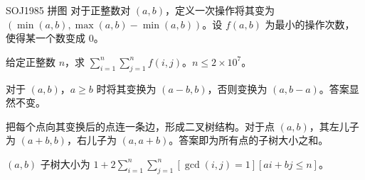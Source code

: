 \documentclass[../main.tex]{subfiles}
\begin{document}
\subsubsection{}

\begin{frame}{SOJ1985 拼图}
对于正整数对 $(a,b)$，定义一次操作将其变为 $(\min(a,b),\max(a,b)-\min(a,b))$。设 $f(a,b)$ 为最小的操作次数，使得某一个数变成 $0$。

给定正整数 $n$，求 $\sum\limits_{i=1}^n\sum\limits_{j=1}^nf(i,j)$。$n\le 2\times10^7$。
\end{frame}

\begin{frame}
对于 $(a,b)$，$a\ge b$ 时将其变换为 $(a-b,b)$，否则变换为 $(a,b-a)$。答案显然不变。\pause

把每个点向其变换后的点连一条边，形成二叉树结构。对于点 $(a,b)$，其左儿子为 $(a+b,b)$，右儿子为 $(a,a+b)$。答案即为所有点的子树大小之和。\pause

\begin{theo}[结论]
$(a,b)$ 子树大小为 $1+2\sum\limits_{i=1}^n\sum\limits_{j=1}^n[\gcd(i,j)=1][ai+bj\le n]$。
\end{theo}
\end{frame}
\end{document}

